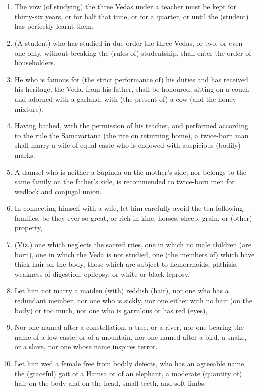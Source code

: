 \chapter{}
\begin{enumerate}
\item The vow (of studying) the three Vedas under a teacher must be kept for thirty-six years, or for half that time, or for a quarter, or until the (student) has perfectly learnt them.
\item (A student) who has studied in due order the three Vedas, or two, or even one only, without breaking the (rules of) studentship, shall enter the order of householders.
\item He who is famous for (the strict performance of) his duties and has received his heritage, the Veda, from his father, shall be honoured, sitting on a couch and adorned with a garland, with (the present of) a cow (and the honey-mixture).
\item Having bathed, with the permission of his teacher, and performed according to the rule the Samavartana (the rite on returning home), a twice-born man shall marry a wife of equal caste who is endowed with auspicious (bodily) marks.
\item A damsel who is neither a Sapinda on the mother's side, nor belongs to the same family on the father's side, is recommended to twice-born men for wedlock and conjugal union.
\item In connecting himself with a wife, let him carefully avoid the ten following families, be they ever so great, or rich in kine, horses, sheep, grain, or (other) property,
\item (Viz.) one which neglects the sacred rites, one in which no male children (are born), one in which the Veda is not studied, one (the members of) which have thick hair on the body, those which are subject to hemorrhoids, phthisis, weakness of digestion, epilepsy, or white or black leprosy.
\item Let him not marry a maiden (with) reddish (hair), nor one who has a redundant member, nor one who is sickly, nor one either with no hair (on the body) or too much, nor one who is garrulous or has red (eyes),
\item Nor one named after a constellation, a tree, or a river, nor one bearing the name of a low caste, or of a mountain, nor one named after a bird, a snake, or a slave, nor one whose name inspires terror.
\item Let him wed a female free from bodily defects, who has an agreeable name, the (graceful) gait of a Hamsa or of an elephant, a moderate (quantity of) hair on the body and on the head, small teeth, and soft limbs.

\end{enumerate}
